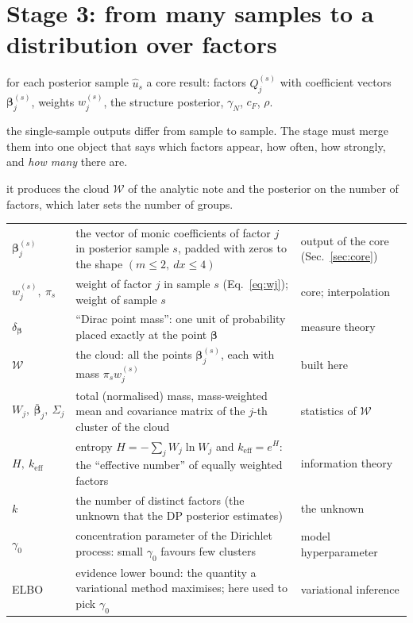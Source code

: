 \documentclass[11pt,a4paper]{article}
\theoremstyle{definition}
\newcommand{\sectionbrief}[3]{\begin{leadin}\begin{description}[nosep,leftmargin=3.0cm,labelwidth=2.8cm]
  \item[Starting from] #1
  \item[Why this section] #2
  \item[Role in the paper] #3
  \end{description}\end{leadin}}
\newcommand{\bs}{\boldsymbol}
\begin{document}


\section{Stage 3: from many samples to a distribution over factors}\label{sec:agg}
\sectionbrief
{for each posterior sample $\hat u_s$ a core result: factors $Q^{(s)}_j$ with coefficient vectors $\bs\beta^{(s)}_j$, weights $w^{(s)}_j$, the structure posterior, $\gamma_N$, $c_F$, $\rho$.}
{the single-sample outputs differ from sample to sample. The stage must merge them into one object that says which factors appear, how often, how strongly, and \emph{how many} there are.}
{it produces the cloud $\mathcal W$ of the analytic note and the posterior on the number of factors, which later sets the number of groups.}

\begin{symbols}
\begin{tabular}{@{}L{2.6cm}L{6.0cm}L{4.3cm}@{}}
$\bs\beta^{(s)}_j$ & the vector of monic coefficients of factor $j$ in posterior sample $s$, padded with zeros to the shape $(m\le2,\ dx\le4)$ & output of the core (Sec.~\ref{sec:core})\\
$w^{(s)}_j,\ \pi_s$ & weight of factor $j$ in sample $s$ (Eq.~\eqref{eq:wj}); weight of sample $s$ & core; interpolation\\
$\delta_{\bs\beta}$ & ``Dirac point mass'': one unit of probability placed exactly at the point $\bs\beta$ & measure theory\\
$\mathcal W$ & the cloud: all the points $\bs\beta^{(s)}_j$, each with mass $\pi_sw^{(s)}_j$ & built here\\
$W_j,\ \bar{\bs\beta}_j,\ \Sigma_j$ & total (normalised) mass, mass-weighted mean and covariance matrix of the $j$-th cluster of the cloud & statistics of $\mathcal W$\\
$H,\ k_{\mathrm{eff}}$ & entropy $H=-\sum_jW_j\ln W_j$ and $k_{\mathrm{eff}}=e^{H}$: the ``effective number'' of equally weighted factors & information theory\\
$k$ & the number of distinct factors (the unknown that the DP posterior estimates) & the unknown\\
$\gamma_0$ & concentration parameter of the Dirichlet process: small $\gamma_0$ favours few clusters & model hyperparameter\\
ELBO & evidence lower bound: the quantity a variational method maximises; here used to pick $\gamma_0$ & variational inference\\
\end{tabular}
\end{symbols}
\end{document}
